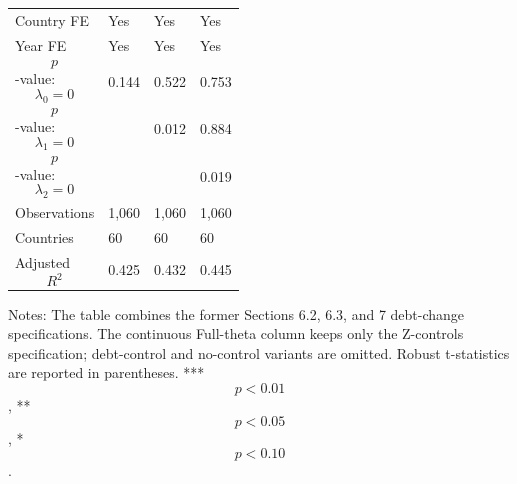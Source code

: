 \begin{table}[H]
\begin{threeparttable}
\begin{tabularx}{\textwidth}{lYYY}
Country FE & Yes & Yes & Yes \\
Year FE & Yes & Yes & Yes \\
$$p$$-value: $$\lambda_0=0$$ & 0.144 & 0.522 & 0.753 \\
$$p$$-value: $$\lambda_1=0$$ &  & 0.012 & 0.884 \\
$$p$$-value: $$\lambda_2=0$$ &  &  & 0.019 \\
Observations & 1,060 & 1,060 & 1,060 \\
Countries & 60 & 60 & 60 \\
Adjusted $$R^2$$ & 0.425 & 0.432 & 0.445 \\
\bottomrule
\end{tabularx}
\begin{tablenotes}[flushleft]\footnotesize
\item Notes: The table combines the former Sections 6.2, 6.3, and 7 debt-change specifications. The continuous Full-theta column keeps only the Z-controls specification; debt-control and no-control variants are omitted. Robust t-statistics are reported in parentheses. *** $$p<0.01$$, ** $$p<0.05$$, * $$p<0.10$$.
\end{tablenotes}
\end{threeparttable}
\end{table}
